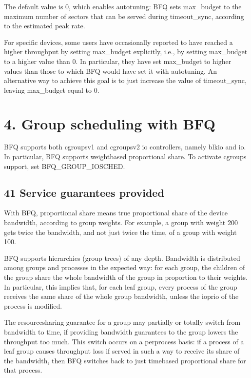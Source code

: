 \documentclass[a4paper,11pt,english]{sphinxmanual}
\begin{document}
The default value is 0, which enables auto\sphinxhyphen{}tuning: BFQ sets max\_budget
to the maximum number of sectors that can be served during
timeout\_sync, according to the estimated peak rate.

For specific devices, some users have occasionally reported to have
reached a higher throughput by setting max\_budget explicitly, i.e., by
setting max\_budget to a higher value than 0. In particular, they have
set max\_budget to higher values than those to which BFQ would have set
it with auto\sphinxhyphen{}tuning. An alternative way to achieve this goal is to
just increase the value of timeout\_sync, leaving max\_budget equal to 0.


\section{4. Group scheduling with BFQ}
\label{\detokenize{bfq-iosched:group-scheduling-with-bfq}}
BFQ supports both cgroups\sphinxhyphen{}v1 and cgroups\sphinxhyphen{}v2 io controllers, namely
blkio and io. In particular, BFQ supports weight\sphinxhyphen{}based proportional
share. To activate cgroups support, set BFQ\_GROUP\_IOSCHED.


\subsection{4\sphinxhyphen{}1 Service guarantees provided}
\label{\detokenize{bfq-iosched:service-guarantees-provided}}
With BFQ, proportional share means true proportional share of the
device bandwidth, according to group weights. For example, a group
with weight 200 gets twice the bandwidth, and not just twice the time,
of a group with weight 100.

BFQ supports hierarchies (group trees) of any depth. Bandwidth is
distributed among groups and processes in the expected way: for each
group, the children of the group share the whole bandwidth of the
group in proportion to their weights. In particular, this implies
that, for each leaf group, every process of the group receives the
same share of the whole group bandwidth, unless the ioprio of the
process is modified.

The resource\sphinxhyphen{}sharing guarantee for a group may partially or totally
switch from bandwidth to time, if providing bandwidth guarantees to
the group lowers the throughput too much. This switch occurs on a
per\sphinxhyphen{}process basis: if a process of a leaf group causes throughput loss
if served in such a way to receive its share of the bandwidth, then
BFQ switches back to just time\sphinxhyphen{}based proportional share for that
process.
\end{document}
